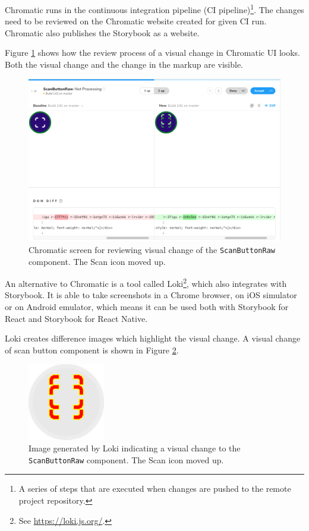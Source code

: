 \documentclass[
  digital, %
  table,   %
  oneside, %
  lof,     %
  lot,     %
]{fithesis3}
\begin{document}
Chromatic runs in the continuous integration pipeline (CI pipeline)\footnote{A series of steps that are executed when changes are pushed to the remote project repository.}. The changes need to be reviewed on the Chromatic website created for given CI run. Chromatic also publishes the Storybook as a website.

Figure \ref{fig:chromatic_diff} shows how the review process of a visual change in Chromatic UI looks. Both the visual change and the change in the markup are visible.

\begin{figure}
    \begin{center}
        \includegraphics[width=\textwidth]{figures/other/chromatic_diff}
    \end{center}
    \caption{Chromatic screen for reviewing visual change of the \texttt{ScanButtonRaw} component. The Scan icon moved up.}
    \label{fig:chromatic_diff}
\end{figure}

An alternative to Chromatic is a tool called Loki\footnote{See \url{https://loki.js.org/}.}, which also integrates with Storybook. It is able to take screenshots in a Chrome browser, on iOS simulator or on Android emulator, which means it can be used both with Storybook for React and Storybook for React Native.

Loki creates difference images which highlight the visual change. A visual change of scan button component is shown in Figure \ref{fig:loki_diff}.

\begin{figure}
    \begin{center}
        \includegraphics[width=0.3\textwidth]{figures/other/loki_diff}
    \end{center}
    \caption{Image generated by Loki indicating a visual change to the \texttt{ScanButtonRaw} component. The Scan icon moved up.}
    \label{fig:loki_diff}
\end{figure}
\end{document}
